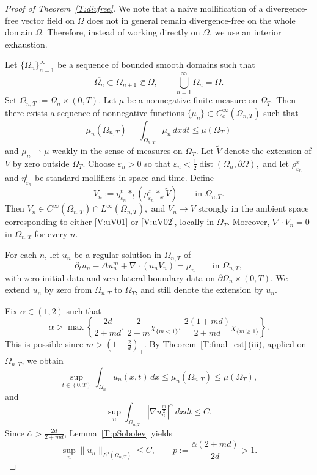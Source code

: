 \documentclass{amsart}
\numberwithin{equation}{section}
\begin{document}
\begin{proof}[Proof of Theorem~\ref{T:divfree}]
We note that a naive mollification of a divergence-free vector field on $\Omega$ does not in general remain divergence-free on the whole domain $\Omega$. Therefore, instead of working directly on $\Omega$, we use an interior exhaustion.

Let $\{\Omega_n\}_{n=1}^\infty$ be a sequence of bounded smooth domains such that
\[
\overline{\Omega_n}\subset \Omega_{n+1}\Subset \Omega,
\qquad
\bigcup_{n=1}^\infty \Omega_n=\Omega.
\]
Set $
\Omega_{n,T}:=\Omega_n\times(0,T).$
Let $\mu$ be a nonnegative finite measure on $\Omega_T$. Then there exists a sequence of nonnegative functions
$
\{\mu_n\}\subset C_c^\infty(\Omega_{n,T})
$
such that
\[
\mu_n(\Omega_{n,T})=\int_{\Omega_{n,T}}\mu_n\,dxdt \le \mu(\Omega_T)
\]
and $\mu_n \rightharpoonup \mu$ weakly in the sense of measures on $\Omega_T$.
Let $\widetilde V$ denote the extension of $V$ by zero outside $\Omega_T$.
Choose $\varepsilon_n>0$ so that $
\varepsilon_n < \frac12 \operatorname{dist}(\Omega_n,\partial\Omega),
$
and let $\rho_{\varepsilon_n}^x$ and $\eta_{\varepsilon_n}^t$ be standard mollifiers in space and time.
Define
\[
V_n:=\eta_{\varepsilon_n}^t *_t \left(\rho_{\varepsilon_n}^x *_x \widetilde V\right)
\qquad \text{in } \Omega_{n,T}.
\]
Then
$
V_n\in C^\infty(\Omega_{n,T})\cap L^\infty(\Omega_{n,T}),
$
and
$
V_n \to V
$ strongly in the ambient space corresponding to either \eqref{V:uV01} or \eqref{V:uV02}, locally in $\Omega_T$.
Moreover, \( \nabla\cdot V_n=0 \) in $\Omega_{n,T}$ for every $n$.


For each $n$, let $u_n$ be a regular solution in $\Omega_{n,T}$ of
\begin{equation}\label{reg-PME_n}
\partial_t u_n-\Delta u_n^m+\nabla\cdot(u_nV_n)=\mu_n
\qquad \text{in } \Omega_{n,T},
\end{equation}
with zero initial data and zero lateral boundary data on
\(
\partial\Omega_n\times(0,T).
\)
We extend $u_n$ by zero from $\Omega_{n,T}$ to $\Omega_T$, and still denote the extension by $u_n$.


Fix $\bar\alpha\in(1,2)$ such that
\begin{equation}\label{alpha-star-divfree}
\bar\alpha>
\max\left\{
\frac{2d}{2+md},
\,
\frac{2}{2-m} \chi_{\{m<1\}},
\,
\frac{2(1+md)}{2+md} \chi_{\{m\ge1\}}
\right\}.
\end{equation}
This is possible since $m>(1-\frac{2}{d})_+$.
By Theorem~\ref{T:final_est}\,\textup{(iii)}, applied on $\Omega_{n,T}$, we obtain
\begin{equation}\label{divfree-est-1}
\sup_{t\in(0,T)}\int_{\Omega_n} u_n(x,t)\,dx
\le
\mu_n(\Omega_{n,T})
\le
\mu(\Omega_T),
\end{equation}
and
\begin{equation}\label{divfree-est-2}
\sup_n
\int_{\Omega_{n,T}}
\left|\nabla u_n^{\frac m2}\right|^{\bar\alpha}\,dxdt
\le C.
\end{equation}
Since $\bar\alpha>\frac{2d}{2+md}$, Lemma~\ref{T:pSobolev} yields
\begin{equation}\label{divfree-est-3}
\sup_n \|u_n\|_{L^p(\Omega_{n,T})}\le C,
\qquad
p:=\frac{\bar\alpha(2+md)}{2d}>1.
\end{equation}


\end{proof}
\end{document}
